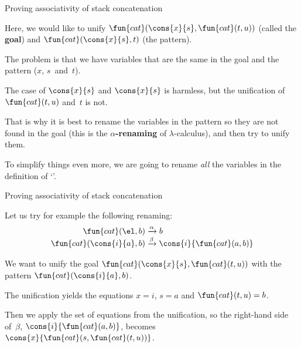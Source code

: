 %
\begin{frame}{Proving associativity of stack concatenation}

 Here, we would like to unify
 \(\fun{cat}(\cons{x}{s},\fun{cat}(t,u))\) (called the \textbf{goal})
 and \(\fun{cat}(\cons{x}{s},t)\) (the pattern).

 \bigskip

The problem is that we have variables that are the same in the goal
and the pattern (\(x\), \(s\)~and~\(t\)).

\bigskip

The case of \(\cons{x}{s}\) and \(\cons{x}{s}\) is harmless, but the
unification of \(\fun{cat}(t,u)\) and~\(t\) is not.

\bigskip

That is why it is best to rename the variables in the pattern so they
are not found in the goal (this is the
\textbf{\(\alpha\)\hyp{}renaming} of \(\lambda\)\hyp{}calculus), and
then try to unify them.

\bigskip

To simplify things even more, we are going to rename \emph{all} the
variables in the definition of `'.

\end{frame}

%
\begin{frame}{Proving associativity of stack concatenation}

  Let us try for example the following renaming:
  \begin{align*}
    \fun{cat}(        \el,b) &\xrightarrow{\alpha} b\\
    \fun{cat}(\cons{i}{a},b) &\xrightarrow{\smash{\beta}}
    \cons{i}{\fun{cat}(a,b)}
  \end{align*}

  We want to unify the goal \(\fun{cat}(\cons{x}{s},\fun{cat}(t,u))\)
  with the pattern \(\fun{cat}(\cons{i}{a},b)\).

  \bigskip

  The unification yields the equations \(x = i\), \(s = a\) and
  \(\fun{cat}(t,u) = b\).

  \bigskip

  Then we apply the set of equations from the unification, so the
  right\hyp{}hand side of~\(\beta\), \(\cons{i}{\fun{cat}(a,b)}\),
  becomes \(\cons{x}{\fun{cat}(s,\fun{cat}(t,u))}\).

\end{frame}

